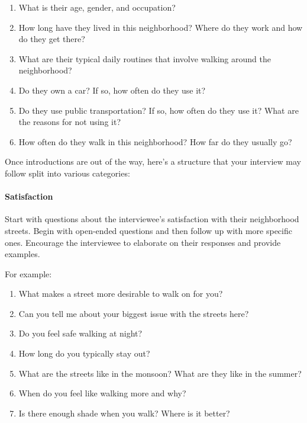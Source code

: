 \documentclass[
]{latex/krantz}
\providecommand{\tightlist}{%
  \setlength{\itemsep}{0pt}\setlength{\parskip}{0pt}}
\begin{document}
\begin{enumerate}
\def\labelenumi{\arabic{enumi}.}
\setcounter{enumi}{1}
\tightlist
\item
  What is their age, gender, and occupation?
\item
  How long have they lived in this neighborhood? Where do they work and how do they get there?
\item
  What are their typical daily routines that involve walking around the neighborhood?
\item
  Do they own a car? If so, how often do they use it?
\item
  Do they use public transportation? If so, how often do they use it? What are the reasons for not using it?
\item
  How often do they walk in this neighborhood? How far do they usually go?
\end{enumerate}

Once introductions are out of the way, here's a structure that your interview may follow split into various categories:

\hypertarget{satisfaction}{%
\paragraph*{Satisfaction}\label{satisfaction}}

Start with questions about the interviewee's satisfaction with their neighborhood streets. Begin with open-ended questions and then follow up with more specific ones. Encourage the interviewee to elaborate on their responses and provide examples.

For example:

\begin{enumerate}
\def\labelenumi{\arabic{enumi}.}
\tightlist
\item
  What makes a street more desirable to walk on for you?
\item
  Can you tell me about your biggest issue with the streets here?
\item
  Do you feel safe walking at night?
\item
  How long do you typically stay out?
\item
  What are the streets like in the monsoon? What are they like in the summer?
\item
  When do you feel like walking more and why?
\item
  Is there enough shade when you walk? Where is it better?
\end{enumerate}
\end{document}
